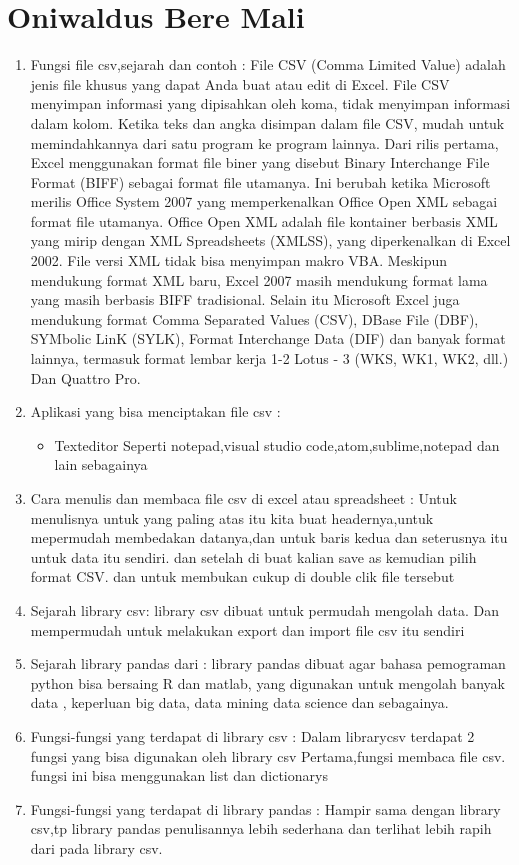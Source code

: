 \section{Oniwaldus Bere Mali}
\begin{enumerate}
\item Fungsi file csv,sejarah dan contoh :
File CSV (Comma Limited Value) adalah jenis file khusus yang dapat Anda buat atau edit di Excel. File CSV menyimpan informasi yang dipisahkan oleh koma, tidak menyimpan informasi dalam kolom. Ketika teks dan angka disimpan dalam file CSV, mudah untuk memindahkannya dari satu program ke program lainnya.
Dari rilis pertama, Excel menggunakan format file biner yang disebut Binary Interchange File Format (BIFF) sebagai format file utamanya. Ini berubah ketika Microsoft merilis Office System 2007 yang memperkenalkan Office Open XML sebagai format file utamanya. Office Open XML adalah file kontainer berbasis XML yang mirip dengan XML Spreadsheets (XMLSS), yang diperkenalkan di Excel 2002. File versi XML tidak bisa menyimpan makro VBA.
Meskipun mendukung format XML baru, Excel 2007 masih mendukung format lama yang masih berbasis BIFF tradisional. Selain itu Microsoft Excel juga mendukung format Comma Separated Values (CSV), DBase File (DBF), SYMbolic LinK (SYLK), Format Interchange Data (DIF) dan banyak format lainnya, termasuk format lembar kerja 1-2 Lotus - 3 (WKS, WK1, WK2, dll.) Dan Quattro Pro.
\item Aplikasi yang  bisa menciptakan file csv :
\begin{itemize}
\item Texteditor
Seperti notepad,visual studio code,atom,sublime,notepad dan lain sebagainya
\end{itemize}
\item Cara menulis dan membaca file csv di excel atau spreadsheet :
Untuk menulisnya untuk yang paling atas itu kita buat headernya,untuk mepermudah membedakan datanya,dan untuk baris kedua dan seterusnya itu untuk data itu sendiri.
dan setelah di buat kalian save as kemudian pilih format CSV.
dan untuk membukan cukup di double clik file tersebut
\item Sejarah library csv:
library csv dibuat untuk permudah mengolah data. Dan mempermudah untuk melakukan export dan import file csv itu sendiri
\item Sejarah library pandas dari :
library pandas dibuat agar bahasa pemograman python bisa bersaing R dan matlab, yang digunakan untuk mengolah banyak data , keperluan big data, data mining data science dan sebagainya.
\item Fungsi-fungsi yang terdapat di library csv :
Dalam librarycsv terdapat 2 fungsi yang bisa digunakan oleh library csv
Pertama,fungsi membaca file csv.
fungsi ini bisa menggunakan list dan dictionarys
 \item Fungsi-fungsi yang terdapat di library pandas :
    Hampir sama dengan library csv,tp library pandas penulisannya lebih sederhana dan terlihat lebih rapih dari pada library csv.


\end{enumerate}

